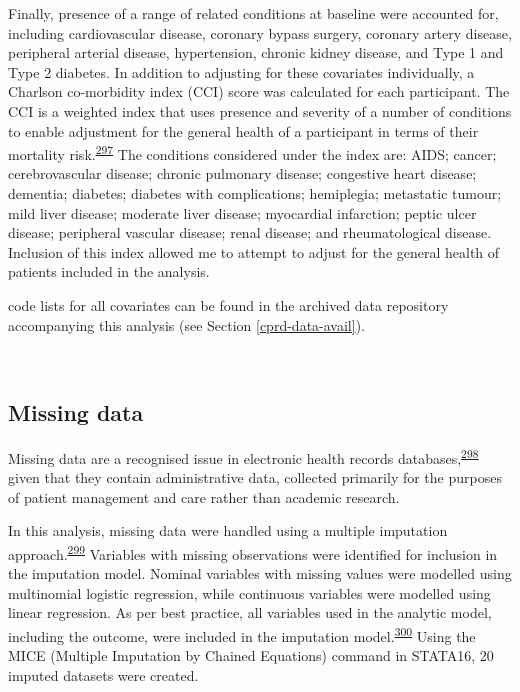 \documentclass[a4paper, twoside]{templates/ociamthesis}
\begin{document}
Finally, presence of a range of related conditions at baseline were accounted for, including cardiovascular disease, coronary bypass surgery, coronary artery disease, peripheral arterial disease, hypertension, chronic kidney disease, and Type 1 and Type 2 diabetes. In addition to adjusting for these covariates individually, a Charlson co-morbidity index (CCI) score was calculated for each participant. The CCI is a weighted index that uses presence and severity of a number of conditions to enable adjustment for the general health of a participant in terms of their mortality risk.\textsuperscript{\protect\hyperlink{ref-charlson1987new}{297}} The conditions considered under the index are: AIDS; cancer; cerebrovascular disease; chronic pulmonary disease; congestive heart disease; dementia; diabetes; diabetes with complications; hemiplegia; metastatic tumour; mild liver disease; moderate liver disease; myocardial infarction; peptic ulcer disease; peripheral vascular disease; renal disease; and rheumatological disease. Inclusion of this index allowed me to attempt to adjust for the general health of patients included in the analysis.

code lists for all covariates can be found in the archived data repository accompanying this analysis (see Section \ref{cprd-data-avail}).

~

\hypertarget{missing-data}{%
\subsection{Missing data}\label{missing-data}}

Missing data are a recognised issue in electronic health records databases,\textsuperscript{\protect\hyperlink{ref-wells2013strategies}{298}} given that they contain administrative data, collected primarily for the purposes of patient management and care rather than academic research.

In this analysis, missing data were handled using a multiple imputation approach.\textsuperscript{\protect\hyperlink{ref-sterne2009}{299}} Variables with missing observations were identified for inclusion in the imputation model. Nominal variables with missing values were modelled using multinomial logistic regression, while continuous variables were modelled using linear regression. As per best practice, all variables used in the analytic model, including the outcome, were included in the imputation model.\textsuperscript{\protect\hyperlink{ref-moons2006}{300}} Using the MICE (Multiple Imputation by Chained Equations) command in STATA16, 20 imputed datasets were created.
\end{document}
